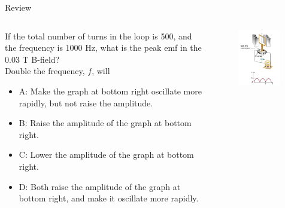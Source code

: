 \documentclass{beamer}
\begin{document}
\begin{frame}{Review}
\begin{columns}[T]
\begin{column}{0.65\textwidth}
\small
If the total number of turns in the loop is 500, and the frequency is 1000 Hz, what is the peak emf in the 0.03 T B-field? \\ \vspace{0.5cm}
Double the frequency, $f$, will
\begin{itemize}
\item A: Make the graph at bottom right oscillate more rapidly, but not raise the amplitude.
\item B: Raise the amplitude of the graph at bottom right.
\item C: Lower the amplitude of the graph at bottom right.
\item D: Both raise the amplitude of the graph at bottom right, and make it oscillate more rapidly.
\end{itemize}
\end{column}
\begin{column}{0.35\textwidth}
\begin{figure}
\centering
\includegraphics[width=0.95\textwidth]{ex6.png}
\caption{\label{fig:ex6}}
\end{figure}
\end{column}
\end{columns}
\end{frame}
\end{document}
